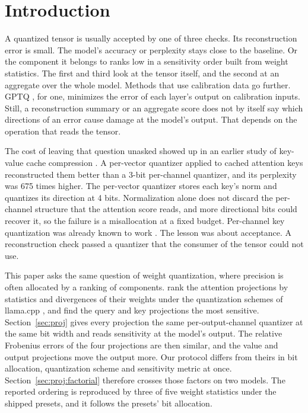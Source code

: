 \documentclass[10pt]{article}
\begin{document}
\section{Introduction}\label{sec:intro}

A quantized tensor is usually accepted by one of three checks. Its reconstruction error is
small. The model's accuracy or perplexity stays close to the baseline. Or the component it
belongs to ranks low in a sensitivity order built from weight statistics. The first and third
look at the tensor itself, and the second at an aggregate over the whole model. Methods that use
calibration data go further. GPTQ \citep{frantar2023gptq}, for one, minimizes the error of each
layer's output on calibration inputs. Still, a reconstruction summary or an aggregate score does
not by itself say which directions of an error cause damage at the model's output. That depends
on the operation that reads the tensor.

The cost of leaving that question unasked showed up in an earlier study of key-value cache compression
\citep{anon2026overview}. A per-vector quantizer applied to cached attention keys
reconstructed them better than a 3-bit per-channel quantizer, and its perplexity was 675
times higher. The per-vector quantizer stores each key's norm and quantizes its direction at
4 bits. Normalization alone does not discard the per-channel structure that the attention
score reads, and more directional bits could recover it, so the failure is a misallocation at
a fixed budget. Per-channel key quantization was already known to work
\citep{liu2024kivi,hooper2024kvquant}. The lesson was about acceptance. A reconstruction check
passed a quantizer that the consumer of the tensor could not use.

This paper asks the same question of weight quantization, where precision is often allocated
by a ranking of components. \citet{rababah2026illusion} rank the attention projections by
statistics and divergences of their weights under the quantization schemes of llama.cpp
\citep{gerganov2023llamacpp}, and find the query and key projections the most sensitive.
Section~\ref{sec:proj} gives every projection the same per-output-channel quantizer at the
same bit width and reads sensitivity at the model's output. The relative Frobenius errors of
the four projections are then similar, and the value and output projections move the output
more. Our protocol differs from theirs in bit allocation, quantization scheme and sensitivity
metric at once. Section~\ref{sec:proj:factorial} therefore crosses those factors on two models.
The reported ordering is reproduced by three of five weight statistics under the shipped
presets, and it follows the presets' bit allocation.
\end{document}
